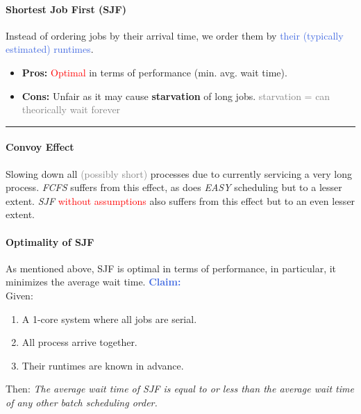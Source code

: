 \documentclass[openany,12pt]{book}
\newcommand{\red}[1]{\textcolor{Red}{#1}}
\newcommand{\blue}[1]{\textcolor{RoyalBlue}{#1}}
\newcommand{\gray}[1]{\textcolor{gray}{#1}}
\begin{document}
\paragraph{Shortest Job First (SJF)} Instead of ordering jobs by their arrival time, we order them by \blue{their (typically estimated) runtimes}.
\begin{itemize}
  \item \textbf{Pros:} \red{Optimal} in terms of performance (min. avg. wait time).
  \item \textbf{Cons:} Unfair as it may cause \textbf{starvation} of long jobs. \gray{starvation = can theorically wait forever}
\end{itemize}

\noindent\rule{\linewidth}{0.4pt}



\paragraph{Convoy Effect} Slowing down all \gray{(possibly short)} processes due to currently servicing a very long process. \textit{FCFS} suffers from this effect, as does \textit{EASY} scheduling but to a lesser extent. \textit{SJF} \red{without assumptions} also suffers from this effect but to an even lesser extent.

\begin{samepage}
  \paragraph{Optimality of SJF} As mentioned above, SJF is optimal in terms of performance, in particular, it minimizes the average wait time. \blue{\textbf{Claim:}}\\
  Given:
  \begin{enumerate}
    \item A 1-core system where all jobs are serial.
    \item All process arrive together.
    \item Their runtimes are known in advance.
  \end{enumerate}
  Then: \textit{The average wait time of SJF is equal to or less than the average wait time of any other batch scheduling order.}
\end{samepage}
\end{document}
